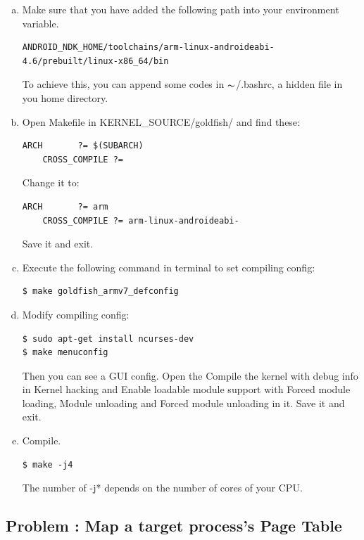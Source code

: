 \documentclass[12pt,a4paper,UTF8]{article}
\theoremstyle{definition}
\numberwithin{equation}{section}
\numberwithin{figure}{section}
\begin{document}
\begin{enumerate}[a.]
  \item Make sure that you have added the following path into your environment variable.
    \begin{lstlisting}[style=cmdmod]
ANDROID_NDK_HOME/toolchains/arm-linux-androideabi-4.6/prebuilt/linux-x86_64/bin
    \end{lstlisting}
    To achieve this, you can append some codes in {\color{blue}$\thicksim$/.bashrc}, a hidden file in you home directory.
  \item Open {\color{blue}Makefile} in {\color{blue}KERNEL\_SOURCE/goldfish/} and find these:
    \begin{lstlisting}[style=cmdmod]
    ARCH       ?= $(SUBARCH)
    CROSS_COMPILE ?=
    \end{lstlisting}
    Change it to:
    \begin{lstlisting}[style=cmdmod]
    ARCH       ?= arm
    CROSS_COMPILE ?= arm-linux-androideabi-
    \end{lstlisting}
    Save it and exit.
  \item Execute the following command in terminal to set compiling config:
    \begin{lstlisting}[style=cmdmod]
$ make goldfish_armv7_defconfig
    \end{lstlisting}
    \item Modify compiling config:
      \begin{lstlisting}[style=cmdmod]
$ sudo apt-get install ncurses-dev
$ make menuconfig
    \end{lstlisting}
    Then you can see a GUI config. Open the {\bashfont\color{cyan} Compile the kernel with debug info} in {\bashfont\color{cyan} Kernel hacking} and {\bashfont\color{cyan} Enable loadable module support} with {\bashfont\color{cyan} Forced module loading}, {\bashfont\color{cyan} Module unloading} and {\bashfont\color{cyan} Forced module unloading} in it. Save it and exit.
    \item Compile.
      \begin{lstlisting}[style=cmdmod]
$ make -j4
    \end{lstlisting}
    The number of {\bashfont\color{cyan}-j*} depends on the number of cores of your CPU.
\end{enumerate}


\subsection{Problem \uppercase\expandafter{} : Map a target process's Page Table}
\end{document}
